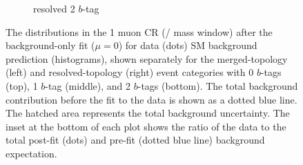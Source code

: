 \begin{figure}[htbp]
\begin{subfigure}{0.45\textwidth}
    \caption{resolved 2 \(b\)-tag}
  \end{subfigure}
  \caption{The \metnolep distributions in the 1 muon CR (\PW / \PZ mass window) after the background-only fit (\(\mu=0\)) for data (dots) SM background prediction (histograms), shown separately for the merged-topology (left) and resolved-topology (right) event categories with 0 \(b\)-tags (top), 1 \(b\)-tag (middle), and 2 \(b\)-tags (bottom). The total background contribution before the fit to the data is shown as a dotted blue line. The hatched area represents the total background uncertainty. The inset at the bottom of each plot shows the ratio of the data to the total post-fit (dots) and pre-fit (dotted blue line) background expectation.}
  \label{fig:monoV:results:observed:cr1}
\end{figure}

